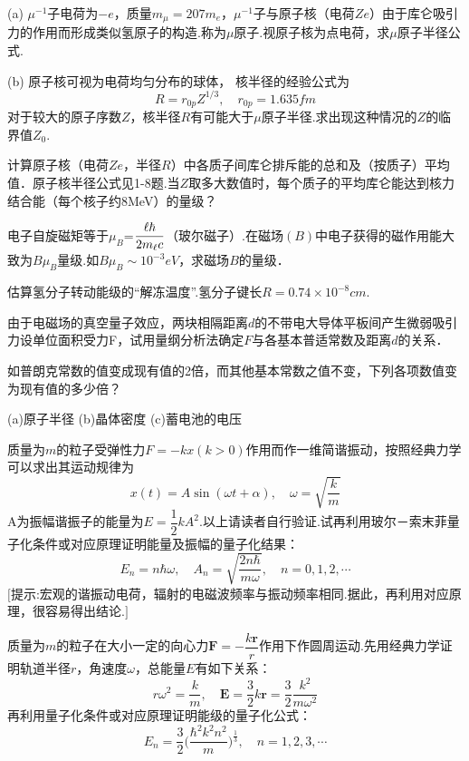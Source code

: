 \begin{exercises}
\exercise (a) $\mu^{-1}$子电荷为$-e$，质量$m_{\mu}=207m_{e}$，$\mu^{-1}$子与原子核（电荷$Ze$）由于库仑吸引力的作用而形成类似氢原子的构造.称为$\mu$原子.视原子核为点电荷，求$\mu$原子半径公式.
	
\quad (b) 原子核可视为电荷均匀分布的球体， 核半径的经验公式为
\begin{equation*}
	R=r_{0p}Z^{1/3},\quad r_{0p}=1.635\si{fm}
\end{equation*}
对于较大的原子序数$Z$，核半径$R$有可能大于$\mu$原子半径.求出现这种情况的$Z$的临界值$Z_{0}$. 

\exercise 计算原子核（电荷$Ze$，半径$R$）中各质子间库仑排斥能的总和及（按质子）平均值．原子核半径公式见1-8题.当$Z$取多大数值时，每个质子的平均库仑能达到核力结合能（每个核子约8\si{MeV}）的量级？

\exercise 电子自旋磁矩等于$\mu_{B}$=$\dfrac{\ell\hbar}{2m_{\ell}c}$（玻尔磁子）.在磁场$(B)$中电子获得的磁作用能大致为$B\mu_{B}$量级.如$B\mu_{B}\sim10^{-3}\si{eV}$，求磁场$B$的量级．

\exercise 估算氢分子转动能级的“解冻温度”.氢分子键长$R=0.74\times10^{-8}\si{cm}$.

\exercise 由于电磁场的真空量子效应，两块相隔距离$d$的不带电大导体平板间产生微弱吸引力设单位面积受力F，试用量纲分析法确定$F$与各基本普适常数及距离$d$的关系．


\exercise 如普朗克常数的值变成现有值的2倍，而其他基本常数之值不变，下列各项数值变为现有值的多少倍？

(a)原子半径 \quad (b)晶体密度 \quad (c)蓄电池的电压

\exercise 质量为$m$的粒子受弹性力$F=-kx(k>0)$作用而作一维简谐振动，按照经典力学可以求出其运动规律为
\begin{equation*}
	x(t)=A\sin(\omega t+\alpha),\quad \omega=\sqrt{\frac{k}{m}}
\end{equation*}
A为振幅谐振子的能量为$E=\dfrac{1}{2}kA^{2}$.以上请读者自行验证.试再利用玻尔－索末菲量子化条件或对应原理证明能量及振幅的量子化结果：
\begin{equation*}
	E_{n}=n\hbar\omega,\quad A_{n}=\sqrt{\frac{2n\hbar}{m\omega}},\quad n=0,1,2,\cdots
\end{equation*}
$\big[$提示:宏观的谐振动电荷，辐射的电磁波频率与振动频率相同.据此，再利用对应原理，很容易得出结论.$\big]$

\exercise 质量为$m$的粒子在大小一定的向心力$\boldsymbol{F}=-\dfrac{k\boldsymbol{r}}{r}$作用下作圆周运动.先用经典力学证明轨道半径$r$，角速度$\omega$，总能量$E$有如下关系：
\begin{equation*}
	r\omega^{2}=\frac{k}{m},\quad \boldsymbol{E}=\frac{3}{2}k\boldsymbol{r}=\frac{3}{2}\frac{k^{2}}{m\omega^{2}}
\end{equation*}
再利用量子化条件或对应原理证明能级的量子化公式：
\begin{equation*}
	E_{n}=\frac{3}{2}\bigg(\frac{\hbar^{2}k^{2}n^{2}}{m} \bigg)^{\frac{1}{3}},\quad n=1,2,3,\cdots
\end{equation*}
 
\end{exercises}